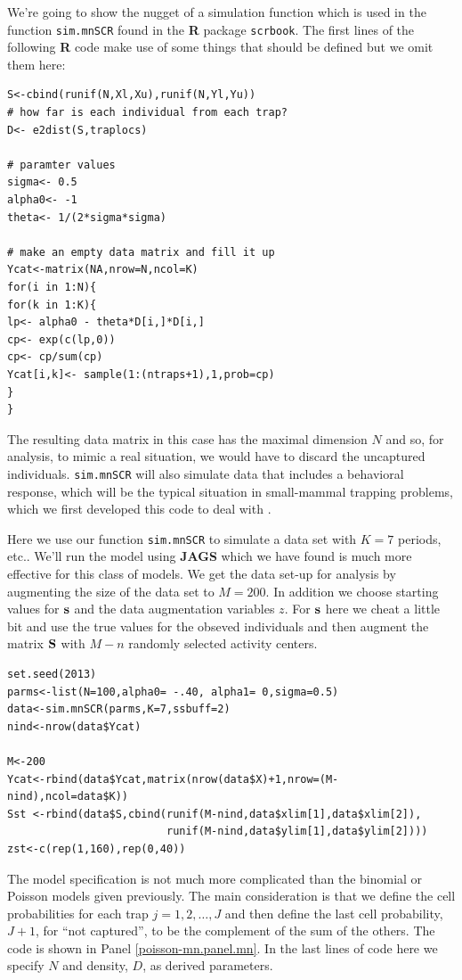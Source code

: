 We're going to show the nugget of a simulation function which is
used in the function \mbox{\tt sim.mnSCR} found in the {\bf R} package
\mbox{\tt scrbook}.  The first lines of the following {\bf R} code
make use of some things that should be defined but we omit them here:
{\small
\begin{verbatim}
S<-cbind(runif(N,Xl,Xu),runif(N,Yl,Yu))
# how far is each individual from each trap?
D<- e2dist(S,traplocs)

# paramter values
sigma<- 0.5
alpha0<- -1
theta<- 1/(2*sigma*sigma)

# make an empty data matrix and fill it up
Ycat<-matrix(NA,nrow=N,ncol=K)
for(i in 1:N){
for(k in 1:K){
lp<- alpha0 - theta*D[i,]*D[i,]
cp<- exp(c(lp,0))
cp<- cp/sum(cp)
Ycat[i,k]<- sample(1:(ntraps+1),1,prob=cp)
}
}
\end{verbatim}
}
The resulting data matrix in this case has the maximal dimension $N$
and so, for analysis, to mimic a real situation, we would have to discard the uncaptured
individuals. 
\mbox{\tt sim.mnSCR} will also simulate data that includes a
behavioral response, which will be the typical situation in
small-mammal trapping problems, which we first developed this code to
deal with \citep[see][for details]{converse_royle:2012}.

Here we use our function \mbox{\tt sim.mnSCR} to simulate a data set
with $K=7$ periods, etc.. We'll run the model using {\bf JAGS} which we
have found is much more effective for this class of models.
We get the data set-up for analysis by augmenting the size of the data
set to $M=200$. In addition we choose starting values for ${\bf s}$ and the
data augmentation variables $z$.  For ${\bf s}$ here we cheat a little bit
and use the true values for the obseved individuals and then augment
the matrix ${\bf S}$ with $M-n$ randomly selected activity centers.

{\small 
\begin{verbatim}
set.seed(2013)
parms<-list(N=100,alpha0= -.40, alpha1= 0,sigma=0.5)
data<-sim.mnSCR(parms,K=7,ssbuff=2)
nind<-nrow(data$Ycat)

M<-200
Ycat<-rbind(data$Ycat,matrix(nrow(data$X)+1,nrow=(M-nind),ncol=data$K))
Sst <-rbind(data$S,cbind(runif(M-nind,data$xlim[1],data$xlim[2]),
                         runif(M-nind,data$ylim[1],data$ylim[2])))
zst<-c(rep(1,160),rep(0,40))
\end{verbatim}
}

The model specification is not much more complicated than the binomial
or Poisson models given previously. The main consideration is that we
define the cell probabilities for each trap $j=1,2,\dots,J$ and then
define the last cell probability, $J+1$, for ``not captured'', to be
the complement of the sum of the others. The code is shown in Panel
\ref{poisson-mn.panel.mn}.
In the last lines of code here we
specify $N$ and density, $D$, as  derived parameters.


